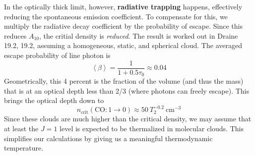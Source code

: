 \documentclass[10pt]{article}
\numberwithin{equation}{section}
\newcommand{\avg}[1]{\left\langle#1\right\rangle}
\begin{document}
  In the optically thick limit, however, \textbf{radiative trapping} happens,
  effectively reducing the spontaneous emission coefficient. To compensate for
  this, we multiply the radiative decay coefficient by the probability of
  escape. Since this reduces $A_{10}$, the critial density is \emph{reduced}.
  The result is worked out in Draine 19.2, 19.2, assuming a homogeneous, static,
  and spherical cloud. The averaged escape probability of line photon is
  \begin{equation}
    \label{eq:mols:14} \avg{\beta} = \frac{1}{1 + 0.5\tau_0} \approx 0.04
  \end{equation}
  Geometrically, this 4 percent is the fraction of the volume (and thus the
  mass) that is at an optical depth less than 2/3 (where photons can freely
  escape). This brings the optical depth down to
  \begin{equation}
    \label{eq:mols:15} n_{\mathrm{crit}}(\mathrm{CO:1\to0}) \approx 50\
    T_2^{-0.2}\ \mathrm{cm^{-3}}
  \end{equation}
  Since these clouds are much higher than the critical density, we may assume
  that at least the $J=1$ level is expected to be thermalized in molecular
  clouds. This simplifies our calculations by giving us a meaningful
  thermodynamic temperature.\\
  
\end{document}
